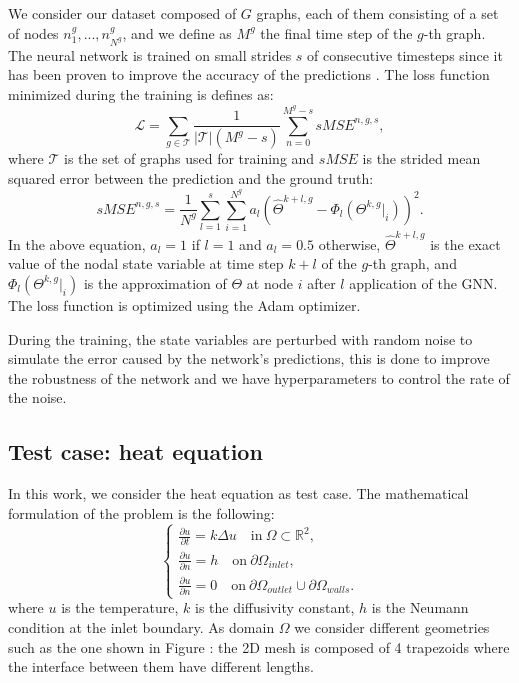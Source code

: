 \documentclass[11pt,a4paper]{article}
\begin{document}
We consider our dataset composed of \(G\) graphs, each of them consisting of a set of nodes \(n_1^g,...,n_{N^g}^g\), and we define as \(M^g\) the final time step of the \(g\)-th graph.
The neural network is trained on small strides \(s\) of consecutive timesteps since it has been proven to improve the accuracy of the predictions \cite{Luca}.
The loss function minimized during the training is defines as:
\begin{equation}
    \mathcal{L} = \sum_{g \in \mathcal{T}} \frac{1}{|\mathcal{T}|(M^g-s)} \sum_{n=0}^{M^g-s} sMSE^{n,g,s},
\end{equation}
where \(\mathcal{T}\) is the set of graphs used for training and \(sMSE\) is the strided mean squared error between the prediction and the ground truth:
\begin{equation}
    sMSE^{n,g,s} = \frac{1}{N^g} \sum_{l=1}^{s} \sum_{i=1}^{N^g} a_l (\hat{\Theta}^{k+l,g} - \Phi_l(\Theta^{k,g}|_i))^2.
    \label{mse}
\end{equation}
In the above equation, \(a_l=1\) if \(l=1\) and \(a_l=0.5\) otherwise, \(\hat{\Theta}^{k+l,g}\) is the exact value of the nodal state variable at time step \(k+l\) of the \(g\)-th graph, and \(\Phi_l(\Theta^{k,g}|_i)\) is the approximation of \(\Theta\) at node \(i\) after \(l\) application of the GNN. 
The loss function is optimized using the Adam optimizer.

During the training, the state variables are perturbed with random noise to simulate the error caused by the network's predictions, this is done to improve the robustness of the network and we have hyperparameters to control the rate of the noise.

\subsection{Test case: heat equation}

In this work, we consider the heat equation as test case. 
The mathematical formulation of the problem is the following:
\begin{equation}
    \begin{cases}
        \frac{\partial u }{\partial t} = k \Delta u \quad \text{in} \ \Omega \subset \mathbb{R}^2, \\
        \frac{\partial u}{\partial n} = h \quad \text{on} \ \partial \Omega_{inlet}, \\
        \frac{\partial u}{\partial n} = 0 \quad \text{on} \ \partial \Omega_{outlet} 
        \cup \partial \Omega_{walls}.
    \end{cases}
\end{equation}
where \(u\) is the temperature, \(k\) is the diffusivity constant, \(h\) is the Neumann condition at the inlet boundary. As domain \(\Omega\) we consider different geometries such as the one shown in Figure : the 2D mesh is composed of 4 trapezoids where the interface between them have different lengths.
\end{document}

